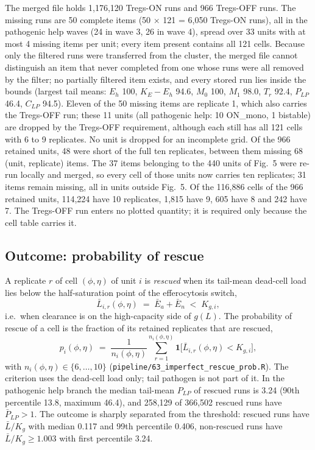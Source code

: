 \documentclass[11pt]{article}
\begin{document}
The merged file holds 1,176,120 Tregs-ON runs and 966 Tregs-OFF runs.
The missing runs are 50 complete items (50 $\times$ 121 = 6,050 Tregs-ON runs),
all in the pathogenic help waves (24 in wave 3, 26 in wave 4), spread over 33
units with at most 4 missing items per unit; every item present contains all
121 cells. Because only the filtered runs were transferred from the cluster, the
merged file cannot distinguish an item that never completed from one whose runs
were all removed by the filter; no partially filtered item exists, and every
stored run lies inside the bounds (largest tail means: $E_h$ 100,
$K_E - E_h$ 94.6, $M_0$ 100, $M_1$ 98.0, $T_r$ 92.4, $P_{LP}$ 46.4, $C_{LP}$
94.5). Eleven of the 50 missing items are replicate 1, which also carries the
Tregs-OFF run; these 11 units (all pathogenic help: 10 ON\_mono, 1 bistable)
are dropped by the Tregs-OFF requirement, although each still has all 121 cells
with 6 to 9 replicates. No unit is dropped for an incomplete grid. Of the 966
retained units, 48 were short of the full ten replicates, between them missing 68
(unit, replicate) items. The 37 items belonging to the 440 units of Fig.~5 were
re-run locally and merged, so every cell of those units now carries ten replicates;
31 items remain missing, all in units outside Fig.~5. Of the 116,886 cells of the
966 retained units, 114,224 have 10 replicates, 1,815 have 9, 605 have 8 and 242 have 7. The Tregs-OFF run enters no plotted
quantity; it is required only because the cell table carries it.

\subsection{Outcome: probability of rescue}

A replicate $r$ of cell $(\phi, \eta)$ of unit $i$ is \emph{rescued} when its
tail-mean dead-cell load lies below the half-saturation point of the
efferocytosis switch,
\begin{equation}
  \bar L_{i,r}(\phi,\eta) \;=\; \bar E_{a} + \bar E_{n} \;<\; K_{g,i},
\end{equation}
i.e.\ when clearance is on the high-capacity side of $g(L)$. The probability of
rescue of a cell is the fraction of its retained replicates that are rescued,
\begin{equation}
  p_i(\phi,\eta) \;=\; \frac{1}{n_i(\phi,\eta)}\sum_{r=1}^{n_i(\phi,\eta)}
  \mathbf{1}\big[\bar L_{i,r}(\phi,\eta) < K_{g,i}\big],
\end{equation}
with $n_i(\phi,\eta) \in \{6,\dots,10\}$
(\texttt{pipeline/63\_imperfect\_rescue\_prob.R}). The criterion uses the
dead-cell load only; tail pathogen is not part of it. In the pathogenic help branch
the median tail-mean $P_{LP}$ of rescued runs is 3.24 (90th percentile 13.8,
maximum 46.4), and 258,129 of 366,502 rescued runs have $\bar P_{LP} > 1$.
The outcome is sharply separated from the threshold: rescued runs have
$\bar L/K_g$ with median 0.117 and 99th percentile 0.406, non-rescued runs have
$\bar L/K_g \ge 1.003$ with first percentile 3.24.
\end{document}
